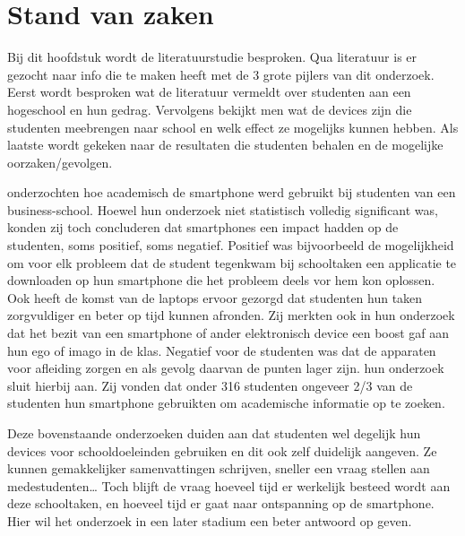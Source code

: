 \chapter{Stand van zaken}
\label{ch:stand-van-zaken}

Bij dit hoofdstuk wordt de literatuurstudie besproken. Qua literatuur is er gezocht naar info die te maken heeft met de 3 grote pijlers van dit onderzoek. Eerst wordt besproken wat de literatuur vermeldt over studenten aan een hogeschool en hun gedrag. Vervolgens bekijkt men wat de devices zijn die studenten meebrengen naar school en welk effect ze mogelijks kunnen hebben. Als laatste wordt gekeken naar de resultaten die studenten behalen en de mogelijke oorzaken/gevolgen.

\textcite{Johnson2017} onderzochten hoe academisch de smartphone werd gebruikt bij studenten van een business-school. Hoewel hun onderzoek niet statistisch volledig significant was, konden zij toch concluderen dat smartphones een impact hadden op de studenten, soms positief, soms negatief. Positief was bijvoorbeeld de mogelijkheid om voor elk probleem dat de student tegenkwam bij schooltaken een applicatie te downloaden op hun smartphone die het probleem deels vor hem kon oplossen. Ook heeft de komst van de laptops ervoor gezorgd dat studenten hun taken zorgvuldiger en beter op tijd kunnen afronden. Zij merkten ook in hun onderzoek dat het bezit van een smartphone of ander elektronisch device een boost gaf aan hun ego of imago in de klas. Negatief voor de studenten was dat de apparaten voor afleiding zorgen en als gevolg daarvan de punten lager zijn. \textcite{Hossain2016} hun onderzoek sluit hierbij aan. Zij vonden dat onder 316 studenten ongeveer 2/3 van de studenten hun smartphone gebruikten om academische informatie op te zoeken. 

Deze bovenstaande onderzoeken duiden aan dat studenten wel degelijk hun devices voor schooldoeleinden gebruiken en dit ook zelf duidelijk aangeven. Ze kunnen gemakkelijker samenvattingen schrijven, sneller een vraag stellen aan medestudenten… Toch blijft de vraag hoeveel tijd er werkelijk besteed wordt aan deze schooltaken, en hoeveel tijd er gaat naar ontspanning op de smartphone. Hier wil het onderzoek in een later stadium een beter antwoord op geven.

